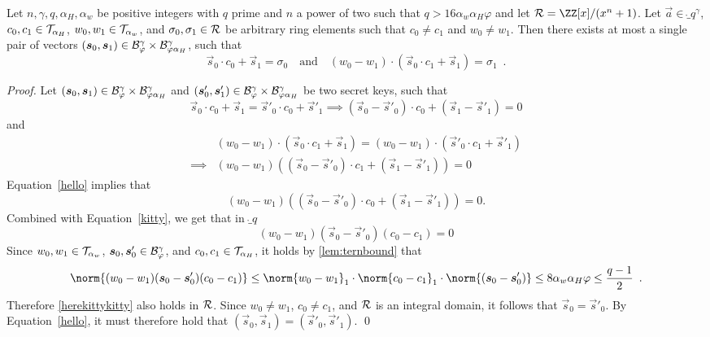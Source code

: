 \begin{lemma}\label{lem:nilssupportivechildsupport}
Let $n,\gamma,q,\alpha_H, \alpha_w$ be positive integers with $q$ prime and $n$ a power of two such that $q > 16 \alpha_w \alpha_H\varphi$ and let $\ring=\ZZ[x]/(x^n+1)$. Let $\vec{a}\in\ring_q^\gamma$, $c_0,c_1 \in \mathcal{T}_{\alpha_{H}}$, $w_0, w_1 \in \mathcal{T}_{\alpha_w}$, and $\sigma_0,\sigma_1 \in \mathcal{R}$ be arbitrary ring elements such that $c_0\neq c_1$ and $w_0 \neq w_1$.
Then there exists at most a single pair of vectors $(\boldsymbol{s}_0,\boldsymbol{s}_1)\in\mathcal{B}^\gamma_{\varphi}\times \mathcal{B}^\gamma_{\varphi\alpha_H}$, such that
    \[
    \vec{s}_0\cdot c_0 + \vec{s}_1 = \sigma_0 \quad\text{and}\quad (w_0 - w_1) \cdot (\vec{s}_0\cdot c_1 + \vec{s}_1) = \sigma_1\enspace.
    \]
\end{lemma}
 \begin{proof}
    Let $(\boldsymbol{s}_0, \boldsymbol{s}_1)\in\mathcal{B}^\gamma_{\varphi}\times \mathcal{B}^\gamma_{\varphi\alpha_H}$ and $(\boldsymbol{s}'_0, \boldsymbol{s}'_1)\in\mathcal{B}^\gamma_{\varphi}\times \mathcal{B}^\gamma_{\varphi\alpha_H}$ be two secret keys, such that 
    \begin{equation}
    \vec{s}_0\cdot c_0 + \vec{s}_1 = \vec{s}'_0\cdot c_0 + \vec{s}'_1 \implies (\vec{s}_0 - \vec{s}'_0)\cdot c_0 + (\vec{s}_1 - \vec{s}'_1) = 0 \label{hello}
    \end{equation}
    and 
    \begin{equation}
    \begin{aligned}
    &(w_0 - w_1) \cdot (\vec{s}_0\cdot c_1 + \vec{s}_1) = (w_0 - w_1) \cdot (\vec{s}'_0\cdot c_1 + \vec{s}'_1)\\ \implies& (w_0 - w_1)((\vec{s}_0 - \vec{s}'_0)\cdot c_1 + (\vec{s}_1 - \vec{s}'_1)) = 0 \label{kitty}
    \end{aligned}
    \end{equation}
    Equation~\ref{hello} implies that 
    \[
    (w_0 - w_1)((\vec{s}_0 - \vec{s}'_0)\cdot c_0 + (\vec{s}_1 - \vec{s}'_1)) = 0.
    \]
    Combined with Equation~\ref{kitty}, we get that in $\ring_q$
    \begin{equation}
    (w_0 - w_1)(\vec{s}_0 - \vec{s}'_0) (c_0 - c_1)  = 0 \label{herekittykitty}
    \end{equation}
    Since $w_0,w_1\in\mathcal{T}_{\alpha_w}$, $\boldsymbol{s}_0,\boldsymbol{s}'_0 \in \mathcal{B}^\gamma_{\varphi}$, and $c_0,c_1\in\mathcal{T}_{\alpha_{H}}$, it holds by \autoref{lem:ternbound} that
    \[
      \norm{(w_0 - w_1)(\vec{s}_0 - \vec{s}'_0) (c_0 - c_1)} \leq \norm{w_0 - w_1}_1\cdot\norm{c_0 - c_1}_1\cdot \norm{(\vec{s}_0 - \vec{s}'_0)} \leq 8\alpha_w\alpha_H\varphi \leq \frac{q-1}{2}\enspace.
    \]
    Therefore \autoref{herekittykitty} also holds in $\mathcal{R}$.
    Since $w_0 \neq w_1$, $c_0 \neq c_1$, and $\mathcal{R}$ is an integral domain, it follows that $\vec{s}_0 = \vec{s}'_0$.
    By Equation~\ref{hello}, it must therefore hold that $(\vec{s}_0, \vec{s}_1) = (\vec{s}'_0, \vec{s}'_1)$.
    \qed
\end{proof}
